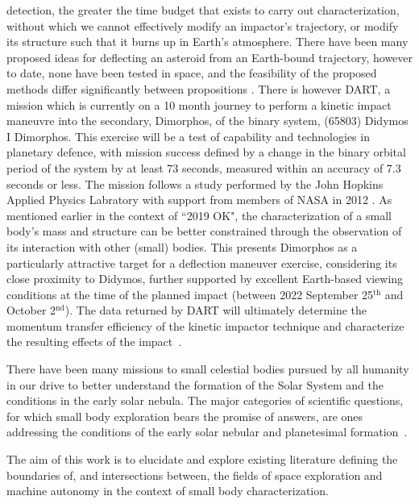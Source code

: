 detection, the greater the time budget that exists to carry out
characterization, without which we cannot effectively modify an impactor's
trajectory, or modify its structure such that it burns up in Earth's atmosphere.
There have been many proposed ideas for deflecting an asteroid from an
Earth-bound trajectory, however to date, none have been tested in space, and the
feasibility of the proposed methods differ significantly between propositions
\cite{Harris2015}. There is however  \gls{DART}, a mission which
is currently on a 10 month journey to perform a kinetic impact maneuvre into the
secondary, Dimorphos, of the binary system, (65803) Didymos I Dimorphos. This
exercise will be a test of  capability and technologies in
planetary defence, with mission success defined by a change in the binary
orbital period of the system by at least 73 seconds, measured within an accuracy
of 7.3 seconds or less. The mission follows a study performed by the John
Hopkins Applied Physics Labratory with support from members of \gls{NASA} in
2012 \cite{Cheng2012}. As mentioned earlier in the context of ``2019 OK", the
characterization of a small body's mass and structure can be better constrained
through the observation of its interaction with other (small) bodies. This
presents Dimorphos as a particularly attractive target for a deflection maneuver
exercise, considering its close proximity to Didymos, further supported by
excellent Earth-based viewing conditions at the time of the planned impact
(between 2022 September 25$^{\text{th}}$ and October 2$^{\text{nd}}$). The data returned by \gls{DART} will
ultimately determine the momentum transfer efficiency of the kinetic impactor
technique and characterize the resulting effects of the impact~\cite{Cheng2012,
Rivkin2021}.

There have been many missions to small celestial bodies pursued by all humanity
in our drive to better understand the formation of the Solar System and the
conditions in the early solar nebula.  The major categories of scientific questions, for which small
body exploration bears the promise of answers, are ones addressing the
conditions of the early solar nebular and planetesimal
formation~\cite{Davidsson2021}.


The aim of this work is to elucidate and explore
existing literature defining the boundaries of, and intersections between, the
fields of space exploration and machine autonomy in the context of small body
characterization.




